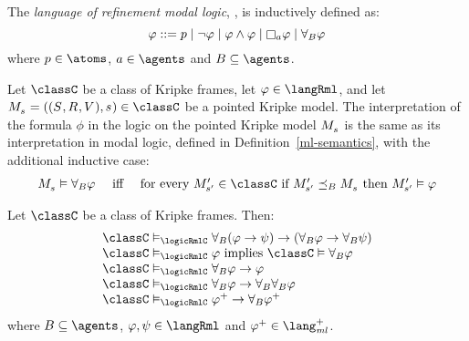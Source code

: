 \begin{definition}
The {\em language of refinement modal logic}, \langRml{}, is inductively defined as:
$$
\phi ::= 
    \atomP \mid
    \lnot \phi \mid
    \phi \land \phi \mid
    \necessaryA \phi \mid
    \allrefsBs \phi
$$
where $\atomP \in \atoms$, $\agentA \in \agents$ and $\agentsB \subseteq \agents$.
\end{definition}

\begin{definition}
Let $\classC$ be a class of Kripke frames, let $\phi \in \langRml$, and let $\kPModelAndTuple{\kStateS} \in \classC$ be a pointed Kripke model.
The interpretation of the formula $\phi$ in the logic \logicRmlC{} on the pointed Kripke model $\kPModel{\kStateS}$ is the same as its interpretation in modal logic, defined in Definition~\ref{ml-semantics}, with the additional inductive case:
$$
\begin{array}{lcl}
    \kPModel{\kStateS} \entails \allrefsBs \phi & \text{ iff } & \text{for every } \kPModelP{\kStateSP} \in \classC \text{ if } \kPModelP{\kStateSP} \refinesBs \kPModel{\kStateS} \text{ then } \kPModelP{\kStateSP} \entails \phi
\end{array}
$$
\end{definition}

\begin{proposition}\label{rml-validities}
Let $\classC$ be a class of Kripke frames. Then:
$$
\begin{array}{l}
    \classC \entails_\logicRmlC \allrefsBs (\phi \implies \psi) \implies (\allrefsBs \phi \implies \allrefsBs \psi)\\
    \classC \entails_\logicRmlC \phi \text{ implies } \classC \entails \allrefsBs \phi\\
    \classC \entails_\logicRmlC \allrefsBs \phi \implies \phi\\
    \classC \entails_\logicRmlC \allrefsBs \phi \implies \allrefsBs \allrefsBs \phi\\
    \classC \entails_\logicRmlC \phi^+ \implies \allrefsBs \phi^+
\end{array}
$$
where $\agentsB \subseteq \agents$, $\phi, \psi \in \langRml$ and $\phi^+ \in \langMlPlus$.
\end{proposition}

